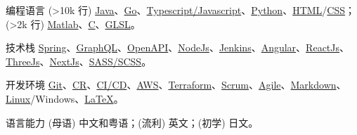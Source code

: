 
\begin{cvskills}
\cvskill
{编程语言}
{(>10k 行) \href{https://www.java.com/en/}{Java}、\href{https://go.dev/}{Go}、\href{https://www.javascript.com/}{Typescript/Javascript}、\href{https://www.python.org/}{Python}、\href{https://developer.mozilla.org/en-US/docs/Glossary/HTML5}{HTML}/\href{https://developer.mozilla.org/en-US/docs/Web/CSS}{CSS}；(>2k 行) \href{https://uk.mathworks.com/products/matlab.html}{Matlab}、\href{https://en.wikipedia.org/wiki/C_(programming_language)}{C}、\href{https://www.khronos.org/opengl/wiki/OpenGL_Shading_Language}{GLSL}。}

\cvskill
{技术栈}
{\href{https://spring.io/}{Spring}、\href{https://graphql.org/}{GraphQL}、\href{https://swagger.io/specification/}{OpenAPI}、\href{https://nodejs.org/en/}{NodeJs}、\href{https://www.jenkins.io/}{Jenkins}、\href{https://angular.io/}{Angular}、\href{https://reactjs.org/}{ReactJs}、\href{https://threejs.org/}{ThreeJs}、\href{https://nextjs.org/}{NextJs}、\href{https://sass-lang.com/}{SASS/SCSS}。}

\cvskill
{开发环境}
{\href{https://git-scm.com/}{Git}、\href{https://en.wikipedia.org/wiki/Code_review}{CR}、\href{https://www.redhat.com/en/topics/devops/what-is-ci-cd}{CI/CD}、\href{https://aws.amazon.com/}{AWS}、\href{https://www.terraform.io/}{Terraform}、\href{https://www.scrum.org/resources/what-is-scrum}{Scrum}、\href{https://www.atlassian.com/agile}{Agile}、\href{https://en.wikipedia.org/wiki/Markdown}{Markdown}、\href{https://en.wikipedia.org/wiki/Unix}{Linux}/Windows、\href{https://www.latex-project.org/}{LaTeX}。}

\cvskill
{语言能力}
{(母语) 中文和粤语；(流利) 英文；(初学) 日文。}

\end{cvskills}